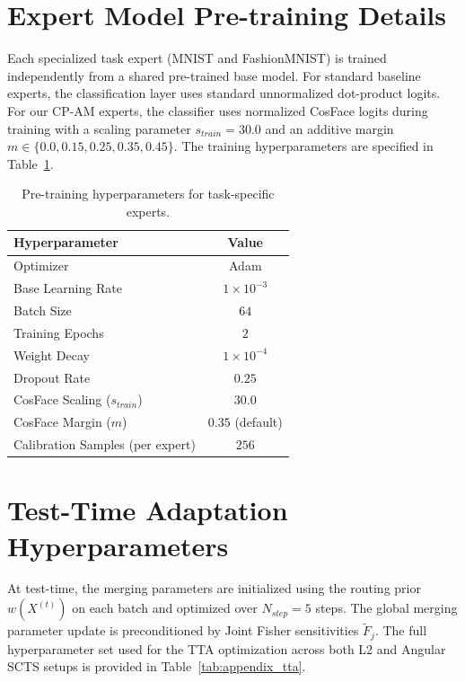 \documentclass{article}
\theoremstyle{plain}
\theoremstyle{definition}
\theoremstyle{remark}
\begin{document}
\section{Expert Model Pre-training Details}
Each specialized task expert (MNIST and FashionMNIST) is trained independently from a shared pre-trained base model. For standard baseline experts, the classification layer uses standard unnormalized dot-product logits. For our CP-AM experts, the classifier uses normalized CosFace logits during training with a scaling parameter $s_{train}=30.0$ and an additive margin $m \in \{0.0, 0.15, 0.25, 0.35, 0.45\}$. The training hyperparameters are specified in Table~\ref{tab:appendix_pretrain}.

\begin{table}[h]
\caption{Pre-training hyperparameters for task-specific experts.}
\label{tab:appendix_pretrain}
\vskip 0.1in
\begin{center}
\begin{small}
\begin{tabular}{lc}
\toprule
Hyperparameter & Value \\
\midrule
Optimizer & Adam \\
Base Learning Rate & $1 \times 10^{-3}$ \\
Batch Size & $64$ \\
Training Epochs & $2$ \\
Weight Decay & $1 \times 10^{-4}$ \\
Dropout Rate & $0.25$ \\
CosFace Scaling ($s_{train}$) & $30.0$ \\
CosFace Margin ($m$) & $0.35$ (default) \\
Calibration Samples (per expert) & $256$ \\
\bottomrule
\end{tabular}
\end{small}
\end{center}
\vskip -0.1in
\end{table}

\section{Test-Time Adaptation Hyperparameters}
At test-time, the merging parameters are initialized using the routing prior $w(X^{(t)})$ on each batch and optimized over $N_{step} = 5$ steps. The global merging parameter update is preconditioned by Joint Fisher sensitivities $\tilde{F}_j$. The full hyperparameter set used for the TTA optimization across both L2 and Angular SCTS setups is provided in Table~\ref{tab:appendix_tta}.
\end{document}
